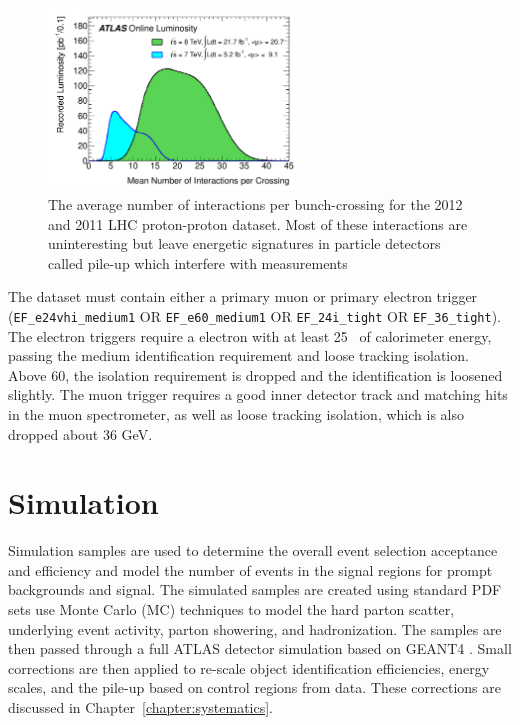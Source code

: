 \begin{figure}[!t]
\centering 
\includegraphics[width=0.60\textwidth]{figs/data/mu_2011_2012-dec.pdf}
\caption{ The average number of interactions per bunch-crossing for the 2012 and 2011 LHC proton-proton dataset. Most of these interactions are uninteresting but leave energetic signatures in particle detectors called pile-up which interfere with measurements}\label{figure:data_pileup}
\end{figure} 

The dataset must contain either a primary muon or primary electron trigger 
(\texttt{EF\_e24vhi\_medium1} OR \texttt{EF\_e60\_medium1} OR \texttt{EF\_24i\_tight} OR \texttt{EF\_36\_tight}). 
The electron triggers require a electron
with at least 25 \gev\ of calorimeter energy, passing the medium identification
requirement and loose tracking isolation.  Above 60\gev, the isolation
requirement is dropped and the identification is loosened slightly. 
The muon trigger requires a good inner detector track and matching
hits in the muon spectrometer, as well as loose tracking isolation,
which is also dropped about 36 GeV.  
            
\section{Simulation}

Simulation samples are used to determine the 
overall event selection acceptance and efficiency and model the number of events in the signal regions
for prompt backgrounds and signal. The simulated samples are created using standard PDF sets
use Monte Carlo (MC) techniques to model the hard parton scatter, underlying event activity, parton showering, and hadronization. 
The samples are then passed through a full ATLAS detector simulation\cite{Aad:2010ah} based on \textsc{GEANT4} \cite{Agostinelli:2002hh}.
Small corrections are then applied to re-scale object identification efficiencies,
energy scales, and the pile-up based on control regions from data. These corrections are discussed in Chapter~\ref{chapter:systematics}. 

